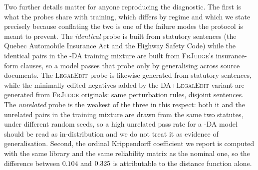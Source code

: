 \documentclass[11pt]{article}
\begin{document}
Two further details matter for anyone reproducing the diagnostic. The first is
what the probes share with training, which differs by regime and which we state
precisely because conflating the two is one of the failure modes the protocol is
meant to prevent. The \emph{identical} probe is built from statutory sentences
(the Quebec Automobile Insurance Act and the Highway Safety Code) while the
identical pairs in the \textsc{-DA} training mixture are built from
\textsc{FrJudge}'s insurance-form clauses, so a model passes that probe only by
generalising across source documents. The \textsc{LegalEdit} probe is likewise
generated from statutory sentences, while the minimally-edited negatives added
by the \textsc{DA+LegalEdit} variant are generated from \textsc{FrJudge}
originals: same perturbation rules, disjoint sentences. The \emph{unrelated}
probe is the weakest of the three in this respect: both it and the unrelated
pairs in the training mixture are drawn from the same two statutes, under
different random seeds, so a high unrelated pass rate for a \textsc{-DA} model
should be read as in-distribution and we do not treat it as evidence of
generalisation. Second, the ordinal Krippendorff coefficient we report is
computed with the same library and the same reliability matrix as the nominal
one, so the difference between $0.104$ and $0.325$ is attributable to the
distance function alone.



\end{document}
